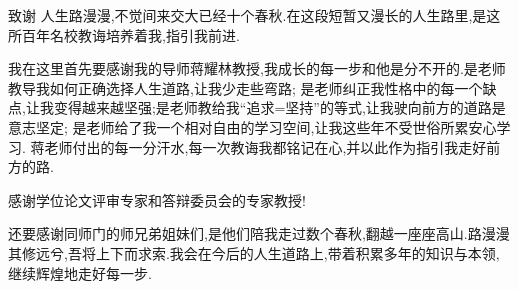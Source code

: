 \documentclass{beamer}
\begin{document}
\begin{frame}{致谢}
\qquad 人生路漫漫,不觉间来交大已经十个春秋.在这段短暂又漫长的人生路里,是这所百年名校教诲培养着我,指引我前进.

\qquad 我在这里首先要感谢我的导师蒋耀林教授,我成长的每一步和他是分不开的.是老师教导我如何正确选择人生道路,让我少走些弯路;
是老师纠正我性格中的每一个缺点,让我变得越来越坚强;是老师教给我``追求=坚持''的等式,让我驶向前方的道路是意志坚定;
是老师给了我一个相对自由的学习空间,让我这些年不受世俗所累安心学习.
蒋老师付出的每一分汗水,每一次教诲我都铭记在心,并以此作为指引我走好前方的路.

\qquad 感谢学位论文评审专家和答辩委员会的专家教授!

\qquad 还要感谢同师门的师兄弟姐妹们,是他们陪我走过数个春秋,翻越一座座高山.路漫漫其修远兮,吾将上下而求索.我会在今后的人生道路上,带着积累多年的知识与本领,继续辉煌地走好每一步.
\end{frame}
\end{document}
